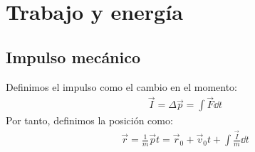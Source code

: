 \documentclass{article}
\begin{document}
\section{Trabajo y energía}
\subsection{Impulso mecánico}
Definimos el impulso como el cambio en el momento:
\begin{equation}
    \begin{split}
        \vec{I}= \Delta \vec{p} = \int \vec{F} \dd{t}
    \end{split}
\end{equation}
Por tanto, definimos la posición como:
\begin{equation}
    \begin{split} 
        \vec{r} = \frac{1}{m} \vec{p}t = \vec{r}_{0} +\vec{v}_{0} t+ \int \frac{\vec{I}}{m} \dd{t}
    \end{split}
\end{equation}
\end{document}
